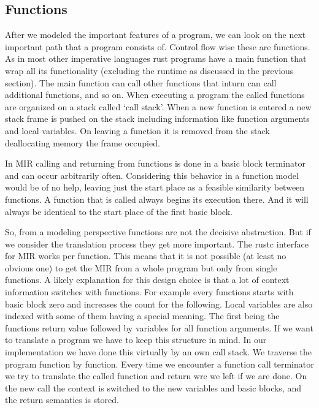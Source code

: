 \subsection{Functions}
After we modeled the important features of a program, we can look on the next important path that a program consists of.
Control flow wise these are functions.
As in most other imperative languages rust programs have a main function that wrap all its functionality (excluding the runtime as discussed in the previous section).
The main function can call other functions that inturn can call additional functions, and so on.
When executing a program the called functions are organized on a stack called `call stack'.
When a new function is entered a new stack frame is pushed on the stack including information like function arguments and local variables.
On leaving a function it is removed from the stack deallocating memory the frame occupied.

In MIR calling and returning from functions is done in a basic block terminator and can occur arbitrarily often.
Considering this behavior in a function model would be of no help, leaving just the start place as a feasible similarity between functions.
A function that is called always begins its execution there.
And it will always be identical to the start place of the first basic block.

So, from a modeling perspective functions are not the decisive abstraction.
But if we consider the translation process they get more important.
The rustc interface for MIR works per function.
This means that it is not possible (at least no obvious one) to get the MIR from a whole program but only from single functions.
A likely explanation for this design choice is that a lot of context information switches with functions.
For example every functions starts with basic block zero and increases the count for the following.
Local variables are also indexed with some of them having a special meaning.
The first being the functions return value followed by variables for all function arguments.
If we want to translate a program we have to keep this structure in mind.
In our implementation we have done this virtually by an own call stack.
We traverse the program function by function.
Every time we encounter a function call terminator we try to translate the called function and return wre we left if we are done.
On the new call the context is switched to the new variables and basic blocks, and the return semantics is stored.

